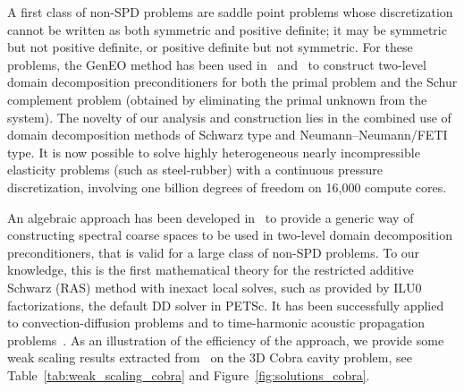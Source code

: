 A first class of non-SPD problems are saddle point problems whose discretization cannot be written as both symmetric and positive definite; it may be symmetric but not positive definite, or positive definite but not symmetric. For these problems, the GenEO method has been used in~\cite{nataf:hal-02343808} and~\cite{brunelli:hal-05123311} to construct two-level domain decomposition preconditioners for both the primal problem and the Schur complement problem (obtained by eliminating the primal unknown from the system). The novelty of our analysis and construction lies in the combined use of domain decomposition methods of Schwarz type and Neumann–Neumann/FETI type. It is now possible to solve highly heterogeneous nearly incompressible elasticity problems (such as steel-rubber) with a continuous pressure discretization, involving one billion degrees of freedom on 16,000 compute cores.

An algebraic approach has been developed in~\cite{nataf:hal-04536547} to provide a generic way of constructing spectral coarse spaces to be used in two-level domain decomposition preconditioners, that is valid for a large class of non-SPD problems. To our knowledge, this is the first mathematical theory for the restricted additive Schwarz (RAS) method with inexact local solves, such as provided by ILU0 factorizations, the default DD solver in PETSc. It has been successfully applied to convection-diffusion problems and to time-harmonic acoustic propagation problems~\cite{dolean:hal-05241475}. As an illustration of the efficiency of the approach, we provide some weak scaling results extracted from~\cite{dolean:hal-05241475} on the 3D Cobra cavity problem, see Table~\ref{tab:weak_scaling_cobra} and Figure~\ref{fig:solutions_cobra}. 

